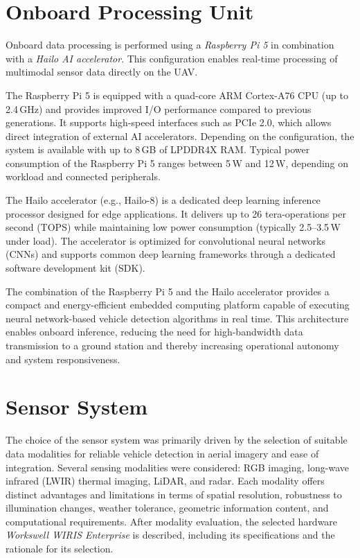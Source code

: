 \documentclass[12pt,oneside,bibtotoc,liststotoc]{scrbook}
\begin{document}
\section{Onboard Processing Unit}

Onboard data processing is performed using a 
\textit{Raspberry Pi 5} in combination with a 
\textit{Hailo AI accelerator}. This configuration enables 
real-time processing of multimodal sensor data directly on 
the UAV.

The Raspberry Pi 5 is equipped with a quad-core ARM 
Cortex-A76 CPU (up to 2.4\,GHz) and provides improved I/O 
performance compared to previous generations. It supports 
high-speed interfaces such as PCIe 2.0, which allows direct 
integration of external AI accelerators. Depending on the 
configuration, the system is available with up to 8\,GB of 
LPDDR4X RAM. Typical power consumption of the Raspberry Pi 5 
ranges between 5\,W and 12\,W, depending on workload and 
connected peripherals.

The Hailo accelerator (e.g., Hailo-8) is a dedicated deep 
learning inference processor designed for edge applications. 
It delivers up to 26 tera-operations per second (TOPS) while 
maintaining low power consumption (typically 2.5–3.5\,W under 
load). The accelerator is optimized for convolutional neural 
networks (CNNs) and supports common deep learning frameworks 
through a dedicated software development kit (SDK).

The combination of the Raspberry Pi 5 and the Hailo accelerator 
provides a compact and energy-efficient embedded computing 
platform capable of executing neural network-based vehicle 
detection algorithms in real time. This architecture enables 
onboard inference, reducing the need for high-bandwidth data 
transmission to a ground station and thereby increasing 
operational autonomy and system responsiveness.

\section{Sensor System}

The choice of the sensor system was primarily driven by the
selection of suitable data modalities for reliable vehicle
detection in aerial imagery and ease of integration. 
Several sensing modalities
were considered: RGB imaging, long-wave infrared (LWIR)
thermal imaging, LiDAR, and radar. Each modality offers
distinct advantages and limitations in terms of spatial
resolution, robustness to illumination changes, weather
tolerance, geometric information content, and computational
requirements. After modality evaluation, the selected
hardware \textit{Workswell WIRIS Enterprise} is described, 
including its specifications and the rationale for its selection.
\end{document}
